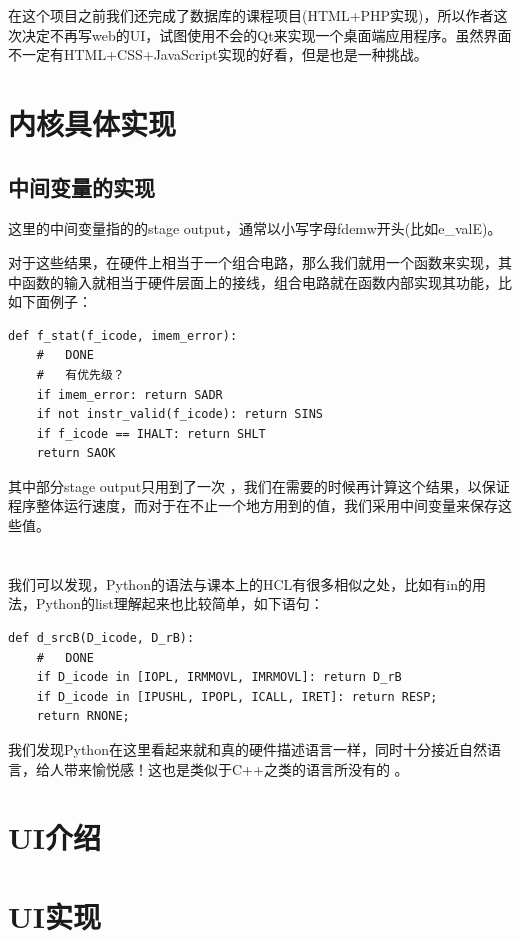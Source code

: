 \documentclass{article}
\begin{document}
在这个项目之前我们还完成了数据库的课程项目(HTML+PHP实现)，所以作者这次决定不再写web的UI，试图使用不会的Qt来实现一个桌面端应用程序。虽然界面不一定有HTML+CSS+JavaScript实现的好看，但是也是一种挑战。


\section{内核具体实现}
\subsection{中间变量的实现}
这里的中间变量指的的stage output，通常以小写字母fdemw开头(比如e\_valE)。

对于这些结果，在硬件上相当于一个组合电路，那么我们就用一个函数来实现，其中函数的输入就相当于硬件层面上的接线，组合电路就在函数内部实现其功能，比如下面例子：

\begin{lstlisting}[frame=single]
def f_stat(f_icode, imem_error):
    #   DONE
    #   有优先级？
    if imem_error: return SADR
    if not instr_valid(f_icode): return SINS
    if f_icode == IHALT: return SHLT
    return SAOK

\end{lstlisting}

其中部分stage output只用到了一次
，我们在需要的时候再计算这个结果，以保证程序整体运行速度，而对于在不止一个地方用到的值，我们采用中间变量来保存这些值。
\\
\\
\\
\indent 我们可以发现，Python的语法与课本上的HCL有很多相似之处，比如有in的用法，Python的list理解起来也比较简单，如下语句：
\begin{lstlisting}[frame=single]
def d_srcB(D_icode, D_rB):
    #   DONE
    if D_icode in [IOPL, IRMMOVL, IMRMOVL]: return D_rB
    if D_icode in [IPUSHL, IPOPL, ICALL, IRET]: return RESP;
    return RNONE;
\end{lstlisting}

我们发现Python在这里看起来就和真的硬件描述语言一样，同时十分接近自然语言，给人带来愉悦感！这也是类似于C++之类的语言所没有的
。

\section{UI介绍}
\section{UI实现}
\end{document}
